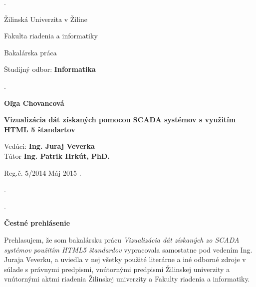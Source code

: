 \begin{titlepage}
\phantom.

\bigskip

\begin{center}
{\sc\LARGE Žilinská Univerzita v Žiline}
\medskip

{\sc\Large Fakulta riadenia a informatiky}

\vfill\vfill\vfill\vfill

{\sc\LARGE Bakalárska práca}

\medskip

{\large Študijný odbor: {\bf Informatika}}
\end{center}


\vfill\vfill\vfill\vfill


\phantom.\hfill

\begin{center}
{\large\bf Oľga Chovancová}

\medskip

{\large\bf Vizualizácia dát získaných pomocou SCADA systémov s využitím HTML 5 štandartov}

\medskip

Vedúci: {\bf Ing. Juraj Veverka}\\
Tútor	\textbf{Ing. Patrik Hrkút, PhD.}
\medskip
 
\hfill
Reg.č. 5/2014
\hfill
Máj 2015
\hfill\phantom.
\end{center}

\hspace{1.7cm}\phantom.

\vspace{2.9cm}

\phantom.
\end{titlepage}

\newpage

\centerline{\bf Čestné prehlásenie}

\vspace{2em}

\noindent
Prehlasujem, že som bakalársku prácu \textit{Vizualizácia dát získaných zo SCADA systémov použitím HTML5 štandardov} vypracovala samostatne pod vedením Ing. Juraja Veverku, a uviedla v nej všetky použité literárne a iné odborné zdroje v súlade s právnymi predpismi, vnútornými predpismi Žilinskej univerzity a vnútornými aktmi riadenia Žilinskej univerzity a Fakulty riadenia a informatiky.

